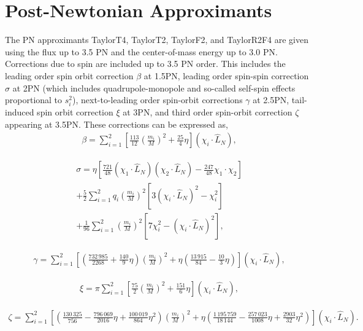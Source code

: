 \section{Post-Newtonian Approximants}

The PN approximants TaylorT4, TaylorT2, TaylorF2, and TaylorR2F4 are given
using the flux up to 3.5 PN and the center-of-mass energy up to 3.0 PN.
Corrections due to spin are included up to 3.5 PN order. This includes the
leading order spin orbit correction $\beta$ at 1.5PN, leading order spin-spin correction $\sigma$ at 2PN 
(which includes quadrupole-monopole and so-called self-spin effects proportional to $s_i^2$), 
next-to-leading order spin-orbit corrections $\gamma$ at 2.5PN, tail-induced spin orbit correction $\xi$ at 3PN, 
and third order spin-orbit correction $\zeta$ appearing at 3.5PN. These corrections can be expressed as,
%
\begin{eqnarray}
%
\beta =  \sum_{i=1}^2 \left[ \frac{113}{12} \left(\frac{m_i}{M}\right)^2 + \frac{25}{4}\eta \right] \left(\chi_i \cdot
\hat{L}_N\right) ,
%
\end{eqnarray}

\begin{eqnarray}
\sigma = \eta \left[ \frac{721}{48} \left( \chi_1 \cdot \hat{L}_N\right) \left( \chi_2 \cdot \hat{L}_N\right) 
- \frac{247}{48} \chi_1 \cdot \chi_2 \right]\nonumber\\
+\frac{5}{2} \sum_{i=1}^2 q_i \left( \frac{m_i}{M}\right)^2 
\left[ 3 \left( \chi_i \cdot \hat{L}_N \right)^2 - \chi_i^2 \right] \nonumber\\
+ \frac{1}{96} \sum_{i=1}^2 \left( \frac{m_i}{M}\right)^2 \left[ 7 \chi_i^2 - \left( \chi_i \cdot \hat{L}_N \right)^2 \right] ,
\end{eqnarray}

\begin{eqnarray}
 \gamma = \sum_{i=1}^2 \left[  \left( \frac{732\,985}{2268} + \frac{140}{9}\eta\right) \left(\frac{m_i}{M}\right)^2 
 + \eta \left(\frac{13\,915}{84} - \frac{10}{3}\eta \right) \right] \left( \chi_i \cdot \hat{L}_N\right) ,
 \end{eqnarray}

\begin{eqnarray}
\xi = \pi \sum_{i=1}^2 \left[ \frac{75}{2} \left(\frac{m_i}{M}\right)^2 + \frac{151}{6} \eta \right] 
\left( \chi_i \cdot \hat{L}_N \right) ,
\end{eqnarray}

\begin{eqnarray}
\zeta = \sum_{i=1}^2 \left[ \left( \frac{130\,325}{756} - \frac{796\,069}{2016}\eta + \frac{100\,019}{864}\eta^2\right) 
\left(\frac{m_i}{M}\right)^2 + \eta \left(\frac{1\,195\,759}{18\,144} - \frac{257\,023}{1008}\eta + \frac{2903}{32}\eta^2\right) 
\right] \left( \chi_i \cdot \hat{L}_N \right) .
\end{eqnarray}

